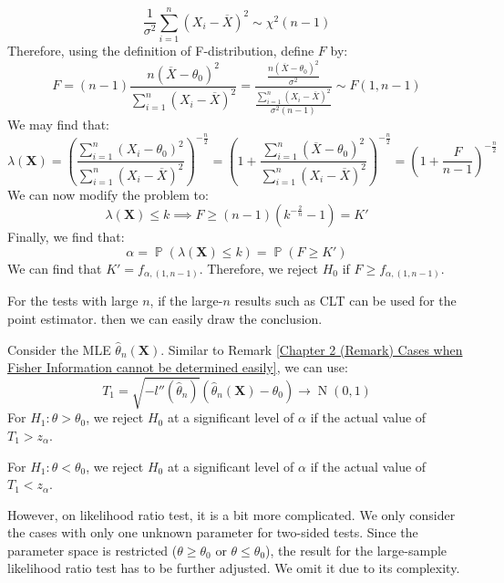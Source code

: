 \documentclass{huhtakm-template-book-v2}
\DeclareMathOperator{\prob}{\mathbb{P}}
\DeclareMathOperator{\N}{N}
\begin{document}
\begin{eg}
	\begin{equation*}
		\frac{1}{\sigma^{2}}\sum_{i=1}^{n}(X_{i}-\overline{X})^{2}\sim\chi^{2}(n-1)
	\end{equation*}
	Therefore, using the definition of F-distribution, define $F$ by:
	\begin{equation*}
		F=(n-1)\frac{n(\overline{X}-\theta_{0})^{2}}{\sum_{i=1}^{n}(X_{i}-\overline{X})^{2}}=\frac{\frac{n(\overline{X}-\theta_{0})^{2}}{\sigma^{2}}}{\frac{\sum_{i=1}^{n}(X_{i}-\overline{X})^{2}}{\sigma^{2}(n-1)}}\sim F(1,n-1)
	\end{equation*}
	We may find that:
	\begin{equation*}
		\lambda(\mathbf{X})=\left(\frac{\sum_{i=1}^{n}(X_{i}-\theta_{0})^{2}}{\sum_{i=1}^{n}(X_{i}-\overline{X})^{2}}\right)^{-\frac{n}{2}}=\left(1+\frac{\sum_{i=1}^{n}(\overline{X}-\theta_{0})^{2}}{\sum_{i=1}^{n}(X_{i}-\overline{X})^{2}}\right)^{-\frac{n}{2}}=\left(1+\frac{F}{n-1}\right)^{-\frac{n}{2}}
	\end{equation*}
	We can now modify the problem to:
	\begin{equation*}
		\lambda(\mathbf{X})\leq k\implies F\geq(n-1)\left(k^{-\frac{2}{n}}-1\right)=K'
	\end{equation*}
	Finally, we find that:
	\begin{equation*}
		\alpha=\prob(\lambda(\mathbf{X})\leq k)=\prob(F\geq K')
	\end{equation*}
	We can find that $K'=f_{\alpha,(1,n-1)}$. Therefore, we reject $H_{0}$ if $F\geq f_{\alpha,(1,n-1)}$.
\end{eg}

\newpage
For the tests with large $n$, if the large-$n$ results such as CLT can be used for the point estimator. then we can easily draw the conclusion.
\begin{eg}
	Consider the MLE $\hat{\theta}_{n}(\mathbf{X})$. Similar to Remark \ref{Chapter 2 (Remark) Cases when Fisher Information cannot be determined easily}, we can use:
	\begin{equation*}
		T_{1}=\sqrt{-l''(\hat{\theta}_{n})}(\hat{\theta}_{n}(\mathbf{X})-\theta_{0})\to\N(0,1)
	\end{equation*}
	For $H_{1}:\theta>\theta_{0}$, we reject $H_{0}$ at a significant level of $\alpha$ if the actual value of $T_{1}>z_{\alpha}$.
	
	For $H_{1}:\theta<\theta_{0}$, we reject $H_{0}$ at a significant level of $\alpha$ if the actual value of $T_{1}<z_{\alpha}$.
\end{eg}
However, on likelihood ratio test, it is a bit more complicated. We only consider the cases with only one unknown parameter for two-sided tests. Since the parameter space is restricted ($\theta\geq\theta_{0}$ or $\theta\leq\theta_{0}$), the result for the large-sample likelihood ratio test has to be further adjusted. We omit it due to its complexity.
\end{document}
